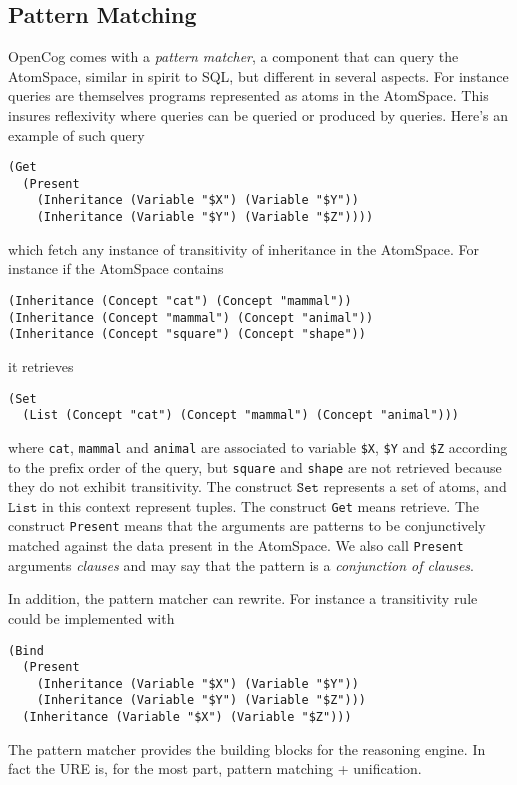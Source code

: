 \documentclass[runningheads]{llncs}
\begin{document}
\subsection{Pattern Matching}
\label{PM}

OpenCog comes with a \emph{pattern matcher}, a component that can
query the AtomSpace, similar in spirit to SQL, but different in
several aspects. For instance queries are themselves programs
represented as atoms in the AtomSpace. This insures reflexivity where
queries can be queried or produced by queries. Here's an example of
such query
\begin{verbatim}
(Get
  (Present
    (Inheritance (Variable "$X") (Variable "$Y"))
    (Inheritance (Variable "$Y") (Variable "$Z"))))
\end{verbatim}
which fetch any instance of transitivity of inheritance in the
AtomSpace. For instance if the AtomSpace contains
\begin{verbatim}
(Inheritance (Concept "cat") (Concept "mammal"))
(Inheritance (Concept "mammal") (Concept "animal"))
(Inheritance (Concept "square") (Concept "shape"))
\end{verbatim}
it retrieves
\begin{verbatim}
(Set
  (List (Concept "cat") (Concept "mammal") (Concept "animal")))
\end{verbatim}
where \texttt{cat}, \texttt{mammal} and \texttt{animal} are associated
to variable \texttt{\$X}, \texttt{\$Y} and \texttt{\$Z} according to
the prefix order of the query, but \texttt{square} and \texttt{shape}
are not retrieved because they do not exhibit transitivity. The
construct $\texttt{Set}$ represents a set of atoms, and
$\texttt{List}$ in this context represent tuples. The construct
\texttt{Get} means retrieve. The construct \texttt{Present} means that
the arguments are patterns to be conjunctively matched against the
data present in the AtomSpace. We also call \texttt{Present} arguments
\emph{clauses} and may say that the pattern is a \emph{conjunction of
  clauses}.

In addition, the pattern matcher can rewrite. For instance a
transitivity rule could be implemented with
\begin{verbatim}
(Bind
  (Present
    (Inheritance (Variable "$X") (Variable "$Y"))
    (Inheritance (Variable "$Y") (Variable "$Z")))
  (Inheritance (Variable "$X") (Variable "$Z")))
\end{verbatim}
The pattern matcher provides the building blocks for the reasoning
engine. In fact the URE is, for the most part, pattern matching +
unification.
\end{document}
